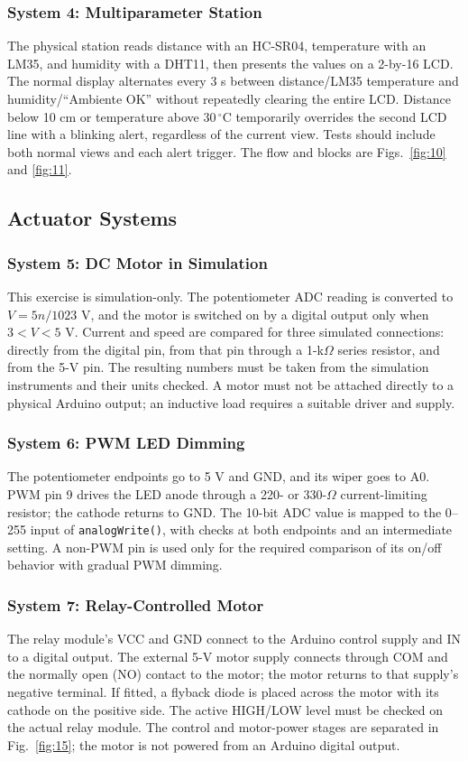\subsubsection{System 4: Multiparameter Station}
The physical station reads distance with an HC-SR04, temperature with an
LM35, and humidity with a DHT11, then presents the values on a 2-by-16 LCD.
The normal display alternates every 3 s between distance/LM35 temperature
and humidity/``Ambiente OK'' without repeatedly clearing the entire LCD.
Distance below 10 cm or temperature above $30\,{}^{\circ}$C temporarily
overrides the second LCD line with a blinking alert, regardless of the
current view. Tests should include both normal views and each alert trigger.
The flow and blocks are Figs.~\ref{fig:10} and \ref{fig:11}.

\subsection{Actuator Systems}

\subsubsection{System 5: DC Motor in Simulation}
This exercise is simulation-only. The potentiometer ADC reading is converted
to $V=5n/1023$ V, and the motor is switched on by a digital output only when
$3<V<5$ V. Current and speed are compared for three simulated connections:
directly from the digital pin, from that pin through a 1-k$\Omega$ series
resistor, and from the 5-V pin. The resulting numbers must be taken from the
simulation instruments and their units checked. A motor must not be attached
directly to a physical Arduino output; an inductive load requires a suitable
driver and supply.

\subsubsection{System 6: PWM LED Dimming}
The potentiometer endpoints go to 5 V and GND, and its wiper goes to A0.
PWM pin 9 drives the LED anode through a 220- or 330-$\Omega$ current-limiting
resistor; the cathode returns to GND. The 10-bit ADC value is mapped to the
0--255 input of \texttt{analogWrite()}, with checks at both endpoints and an
intermediate setting. A non-PWM pin is used only for the required comparison
of its on/off behavior with gradual PWM dimming.

\subsubsection{System 7: Relay-Controlled Motor}
The relay module's VCC and GND connect to the Arduino control supply and IN
to a digital output. The external 5-V motor supply connects through COM and
the normally open (NO) contact to the motor; the motor returns to that
supply's negative terminal. If fitted, a flyback diode is placed across the
motor with its cathode on the positive side. The active HIGH/LOW level must
be checked on the actual relay module. The control and motor-power stages
are separated in Fig.~\ref{fig:15}; the motor is not powered from an Arduino
digital output.

